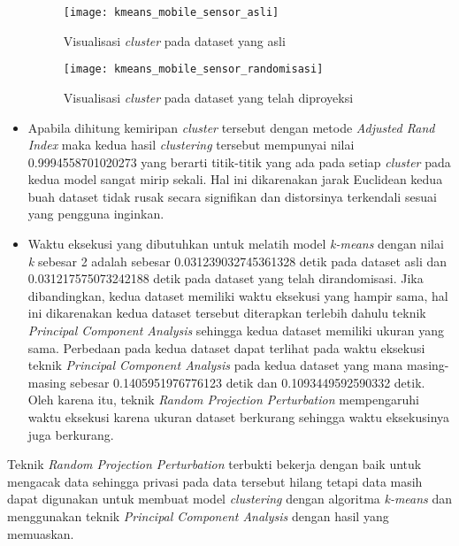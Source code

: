 \begin{itemize}
	\begin{figure}
		\centering
		\texttt{[image: kmeans\_mobile\_sensor\_asli]}
		\caption{Visualisasi \textit{cluster} pada dataset yang asli}
		\label{fig:kmeans_mobile_sensor_asli}
	\end{figure}
	
	\begin{figure}
		\centering
		\texttt{[image: kmeans\_mobile\_sensor\_randomisasi]}
		\caption{Visualisasi \textit{cluster} pada dataset yang telah diproyeksi}
		\label{fig:kmeans_mobile_sensor_randomisasi}
	\end{figure}
	
	\item Apabila dihitung kemiripan \textit{cluster} tersebut dengan metode \textit{Adjusted Rand Index} maka kedua hasil \textit{clustering} tersebut mempunyai nilai 0.9994558701020273 yang berarti titik-titik yang ada pada setiap \textit{cluster} pada kedua model sangat mirip sekali. Hal ini dikarenakan jarak Euclidean kedua buah dataset tidak rusak secara signifikan dan distorsinya terkendali sesuai yang pengguna inginkan.
	\item Waktu eksekusi yang dibutuhkan untuk melatih model \textit{k-means} dengan nilai \textit{k} sebesar 2 adalah sebesar 0.031239032745361328 detik pada dataset asli dan 0.031217575073242188 detik pada dataset yang telah dirandomisasi. Jika dibandingkan, kedua dataset memiliki waktu eksekusi yang hampir sama, hal ini dikarenakan kedua dataset tersebut diterapkan terlebih dahulu teknik \textit{Principal Component Analysis} sehingga kedua dataset memiliki ukuran yang sama. Perbedaan pada kedua dataset dapat terlihat pada waktu eksekusi teknik \textit{Principal Component Analysis} pada kedua dataset yang mana masing-masing sebesar 0.1405951976776123 detik dan 0.1093449592590332 detik. Oleh karena itu, teknik \textit{Random Projection Perturbation} mempengaruhi waktu eksekusi karena ukuran dataset berkurang sehingga waktu eksekusinya juga berkurang.
\end{itemize}

Teknik \textit{Random Projection Perturbation} terbukti bekerja dengan baik untuk mengacak data sehingga privasi pada data tersebut hilang tetapi data masih dapat digunakan untuk membuat model \textit{clustering} dengan algoritma \textit{k-means} dan menggunakan teknik \textit{Principal Component Analysis} dengan hasil yang memuaskan.

